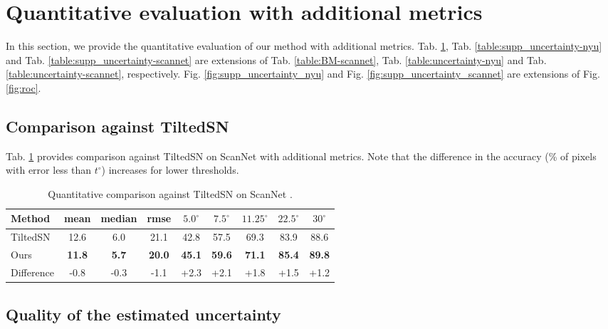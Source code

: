 \documentclass[10pt,twocolumn,letterpaper]{article}
\begin{document}
\section{Quantitative evaluation with additional metrics}
\label{sec:quantitative}

In this section, we provide the quantitative evaluation of our method with additional metrics. Tab. \ref{table:supp_tiltedsn_comparison}, Tab. \ref{table:supp_uncertainty-nyu} and Tab. \ref{table:supp_uncertainty-scannet} are extensions of Tab. \ref{table:BM-scannet}, Tab. \ref{table:uncertainty-nyu} and Tab. \ref{table:uncertainty-scannet}, respectively. Fig. \ref{fig:supp_uncertainty_nyu} and Fig. \ref{fig:supp_uncertainty_scannet} are extensions of Fig. \ref{fig:roc}.

\subsection{Comparison against TiltedSN}

Tab. \ref{table:supp_tiltedsn_comparison} provides comparison against TiltedSN \cite{SNfromRGB_20_TiltedSN} on ScanNet \cite{ScanNet} with additional metrics. Note that the difference in the accuracy (\% of pixels with error less than $t^\circ$) increases for lower thresholds. 

\begin{table}[h]
\normalsize
\begin{center}
\begin{tabular}{l|ccc|ccccc}
\toprule
Method & mean & median & rmse & $5.0^{\circ}$ & $7.5^{\circ}$ & $11.25^{\circ}$ & $22.5^{\circ}$ & $30^{\circ}$ \\
\midrule
TiltedSN\cite{SNfromRGB_20_TiltedSN} 
& 12.6 & 6.0 & 21.1 
& 42.8 & 57.5 & 69.3 & 83.9 & 88.6 \\
Ours 
& \textbf{11.8} & \textbf{5.7} & \textbf{20.0} 
& \textbf{45.1} & \textbf{59.6} & \textbf{71.1} & \textbf{85.4} & \textbf{89.8} \\
\hline
Difference
& -0.8 & -0.3 & -1.1
& +2.3 & +2.1 & +1.8 & +1.5 & +1.2 \\
\bottomrule
\end{tabular}
\end{center}
\caption{Quantitative comparison against TiltedSN \cite{SNfromRGB_20_TiltedSN} on ScanNet \cite{ScanNet}.}
\label{table:supp_tiltedsn_comparison}
\end{table}

\subsection{Quality of the estimated uncertainty}
\end{document}
